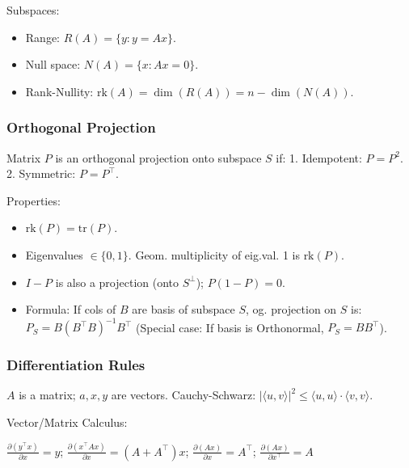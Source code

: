 Subspaces:
\begin{itemize}
    \item Range: $R(A) = \{y : y = Ax\}$.
    \item Null space: $N(A) = \{x : Ax = 0\}$.
    \item Rank-Nullity: $\text{rk}(A) = \dim(R(A)) = n - \dim(N(A))$.
\end{itemize}

\subsubsection{Orthogonal Projection}
Matrix $P$ is an orthogonal projection onto subspace $S$ if:
1. Idempotent: $P = P^2$.
2. Symmetric: $P = P^\top$.

Properties:
\begin{itemize}
    \item $\text{rk}(P) = \text{tr}(P)$.
    \item Eigenvalues $\in \{0, 1\}$. Geom. multiplicity of eig.val. 1 is $\text{rk}(P)$.
    \item $I - P$ is also a projection (onto $S^\perp$); $P(1-P) = 0$.
    \item Formula: If cols of $B$ are basis of subspace $S$, og. projection on $S$ is:
    $P_S = B(B^\top B)^{-1} B^\top $
    (Special case: If basis is Orthonormal, $P_S = B B^\top$).
\end{itemize}

\subsubsection{Differentiation Rules}
$A$ is a matrix; $a, x, y$ are vectors.
Cauchy-Schwarz: $|\langle u, v \rangle|^2 \leq \langle u, u \rangle \cdot \langle v, v \rangle$.

Vector/Matrix Calculus:

$\frac{\partial (y^\top x)}{\partial x} = y$; $\frac{\partial (x^\top A x)}{\partial x} = (A + A^\top)x$; $\frac{\partial (Ax)}{\partial x} = A^\top$; $\frac{\partial (Ax)}{\partial x^\top} = A$

